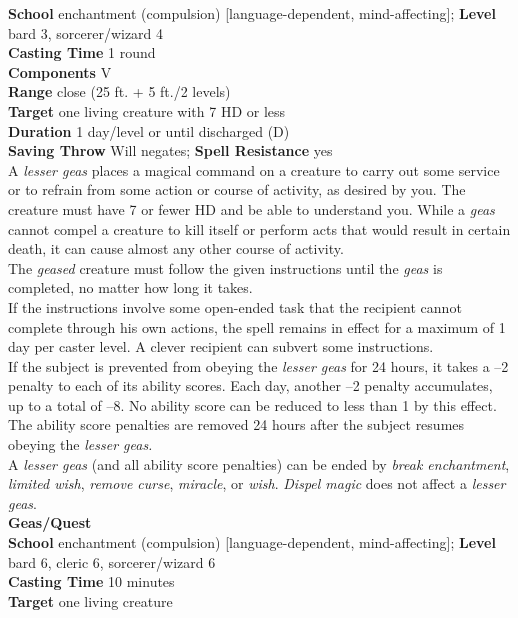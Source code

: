 \textbf{School} enchantment (compulsion) [language-dependent, mind-affecting]; \textbf{Level} bard 3, sorcerer/wizard 4\\
\textbf{Casting Time} 1 round\\
\textbf{Components} V\\
\textbf{Range} close (25 ft. + 5 ft./2 levels)\\
\textbf{Target} one living creature with 7 HD or less\\
\textbf{Duration} 1 day/level or until discharged (D)\\
\textbf{Saving Throw }Will negates; \textbf{Spell Resistance} yes\\
A \textit{lesser geas }places a magical command on a creature to carry out some service or to refrain from some action or course of activity, as desired by you. The creature must have 7 or fewer HD and be able to understand you. While a \textit{geas }cannot compel a creature to kill itself or perform acts that would result in certain death, it can cause almost any other course of activity.\\
The \textit{geased }creature must follow the given instructions until the \textit{geas }is completed, no matter how long it takes.\\
If the instructions involve some open-ended task that the recipient cannot complete through his own actions, the spell remains in effect for a maximum of 1 day per caster level. A clever recipient can subvert some instructions.\\
If the subject is prevented from obeying the \textit{lesser geas }for 24 hours, it takes a –2 penalty to each of its ability scores. Each day, another –2 penalty accumulates, up to a total of –8. No ability score can be reduced to less than 1 by this effect. The ability score penalties are removed 24 hours after the subject resumes obeying the \textit{lesser geas.}\\
A \textit{lesser geas }(and all ability score penalties) can be ended by \textit{break enchantment}, \textit{limited wish}, \textit{remove curse}, \textit{miracle}, or \textit{wish}. \textit{Dispel magic }does not affect a \textit{lesser geas}.\\
\textbf{Geas/Quest}\\
\textbf{School }enchantment (compulsion) [language-dependent, mind-affecting]; \textbf{Level }bard 6, cleric 6, sorcerer/wizard 6\\
\textbf{Casting Time }10 minutes\\
\textbf{Target }one living creature\\
